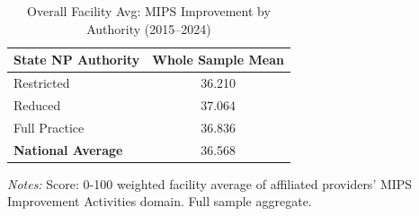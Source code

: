 \begin{table}[htbp]
    \centering
    \caption{Overall Facility Avg: MIPS Improvement by Authority (2015--2024)}
    \label{tab:fac_mips_ia_score_full}
    \vspace{0.2cm}
    \begin{tabular}{lc}
        \toprule
        \textbf{State NP Authority} & \textbf{Whole Sample Mean} \\
        \midrule
        Restricted & 36.210 \\
        Reduced & 37.064 \\
        Full Practice & 36.836 \\
        \midrule
        \textbf{National Average} & 36.568 \\
        \bottomrule
    \end{tabular}
    \vspace{0.1cm}
    \begin{minipage}{0.6\textwidth}
        \footnotesize \textit{Notes:} Score: 0-100 weighted facility average of affiliated providers' MIPS Improvement Activities domain. Full sample aggregate.
    \end{minipage}
\end{table}